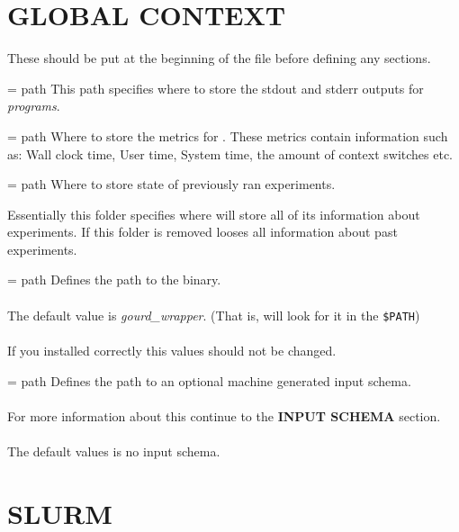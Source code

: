 \documentclass[a4paper,english]{article}
\begin{document}
\begin{adjustwidth}{18pt}{0pt}
  \section{GLOBAL CONTEXT}

    These should be put at the beginning of the file before defining any sections.

    \begin{Description}[Options]\setlength{\itemsep}{0cm}
        \item[\Opt{output\_path} = path]
        This path specifies where to store the stdout and stderr outputs for \emph{programs}.

        \item[\Opt{metrics\_path} = path]
        Where to store the metrics for  .
        These metrics contain information such as: Wall clock time,
        User time, System time, the amount of context switches etc.

        \item[\Opt{experiments\_folder} = path]
        Where to store state of previously ran experiments.

        Essentially this folder specifies where  will store all of its information about experiments.
        If this folder is removed  looses all information about past experiments.

        \item[\Opt{wrapper?} = path]
        Defines the path to the  binary. \\ \\
        The default value is \emph{gourd\_wrapper}.
        (That is,  will look for it in the \texttt{\$PATH}) \\ \\
        If you installed  correctly this values should not be changed.

        \item[\Opt{input\_schema?} = path]
        Defines the path to an optional machine generated input schema. \\ \\
        For more information about this continue to the \textbf{INPUT SCHEMA}
        section. \\ \\
        The default values is no input schema.
    \end{Description}

    \section{SLURM}


\end{adjustwidth}
\end{document}
